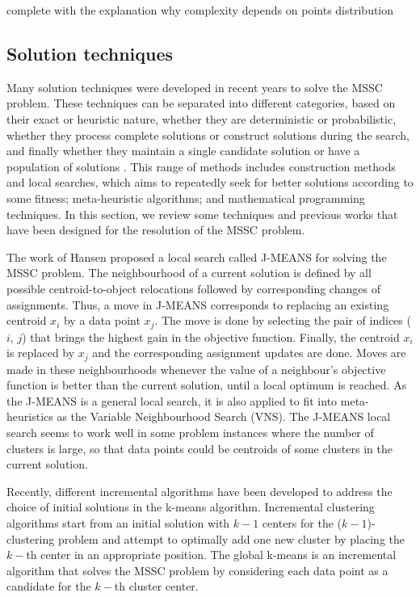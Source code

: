 \noindent [TO-DO] complete with the explanation why complexity depends on points distribution

\subsection{Solution techniques}
Many solution techniques were developed in recent years to solve the MSSC problem. These techniques can be separated into different categories, based on their exact or heuristic nature, whether they are deterministic or probabilistic, whether they process complete solutions or construct solutions during the search, and finally whether they maintain a single candidate solution or have a population of solutions \cite{Das2009}. This range of methods includes construction methods and local searches, which aims to repeatedly seek for better solutions according to some fitness; meta-heuristic algorithms; and mathematical programming techniques. In this section, we review some techniques and previous works that have been designed for the resolution of the MSSC problem.

The work of Hansen \cite{Hansen2001} proposed a local search called J-MEANS for solving the MSSC problem. The neighbourhood of a current solution is defined by all possible centroid-to-object relocations followed by corresponding changes of assignments. Thus, a move in J-MEANS corresponds to replacing an existing centroid $x_i$ by a data point $x_j$. The move is done by selecting the pair of indices ($i$, $j$) that brings the highest gain in the objective function. Finally, the centroid $x_i$ is replaced by $x_j$ and the corresponding assignment updates are done. Moves are made in these neighbourhoods whenever the value of a neighbour's objective function is better than the current solution, until a local optimum is reached. As the J-MEANS is a general local search, it is also applied to fit into meta-heuristics as the Variable Neighbourhood Search (VNS). The J-MEANS local search seems to work well in some problem instances where the number of clusters is large, so that data points could be centroids of some clusters in the current solution.

Recently, different incremental algorithms have been developed to address the choice of initial solutions in the k-means algorithm. Incremental clustering algorithms start from an initial solution with $k - 1$ centers for the ($k - 1$)-clustering problem and attempt to optimally add one new cluster by placing the $k-$th center in an appropriate position. The global k-means \cite{Likas2003} is an incremental algorithm that solves the MSSC problem by considering each data point as a candidate for the $k-$th cluster center.

